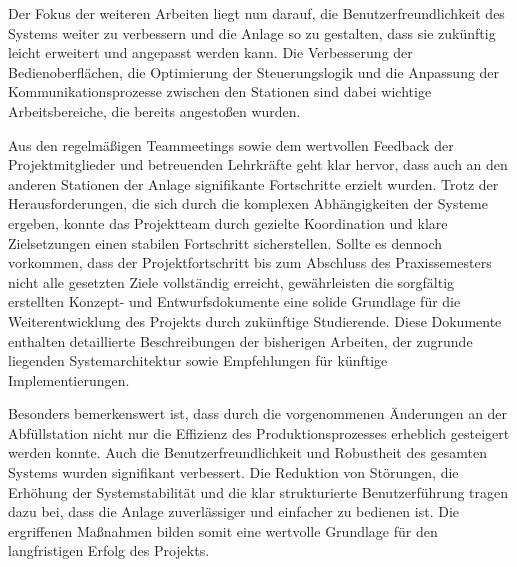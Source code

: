 Der Fokus der weiteren Arbeiten liegt nun darauf, die Benutzerfreundlichkeit des Systems weiter zu verbessern und die Anlage so zu gestalten, 
dass sie zukünftig leicht erweitert und angepasst werden kann. Die Verbesserung der Bedienoberflächen, die Optimierung der Steuerungslogik und 
die Anpassung der Kommunikationsprozesse zwischen den Stationen sind dabei wichtige Arbeitsbereiche, die bereits angestoßen wurden.

Aus den regelmäßigen Teammeetings sowie dem wertvollen Feedback der Projektmitglieder und betreuenden Lehrkräfte geht klar hervor, dass auch an 
den anderen Stationen der Anlage signifikante Fortschritte erzielt wurden. Trotz der Herausforderungen, die sich durch die komplexen 
Abhängigkeiten der Systeme ergeben, konnte das Projektteam durch gezielte Koordination und klare Zielsetzungen einen stabilen Fortschritt 
sicherstellen. Sollte es dennoch vorkommen, dass der Projektfortschritt bis zum Abschluss des Praxissemesters nicht alle gesetzten Ziele 
vollständig erreicht, gewährleisten die sorgfältig erstellten Konzept- und Entwurfsdokumente eine solide Grundlage für die Weiterentwicklung 
des Projekts durch zukünftige Studierende. Diese Dokumente enthalten detaillierte Beschreibungen der bisherigen Arbeiten, der zugrunde liegenden 
Systemarchitektur sowie Empfehlungen für künftige Implementierungen.

Besonders bemerkenswert ist, dass durch die vorgenommenen Änderungen an der Abfüllstation nicht nur die Effizienz des Produktionsprozesses 
erheblich gesteigert werden konnte. Auch die Benutzerfreundlichkeit und Robustheit des gesamten Systems wurden signifikant verbessert. 
Die Reduktion von Störungen, die Erhöhung der Systemstabilität und die klar strukturierte Benutzerführung tragen dazu bei, dass die Anlage 
zuverlässiger und einfacher zu bedienen ist. Die ergriffenen Maßnahmen bilden somit eine wertvolle Grundlage für den langfristigen Erfolg 
des Projekts.